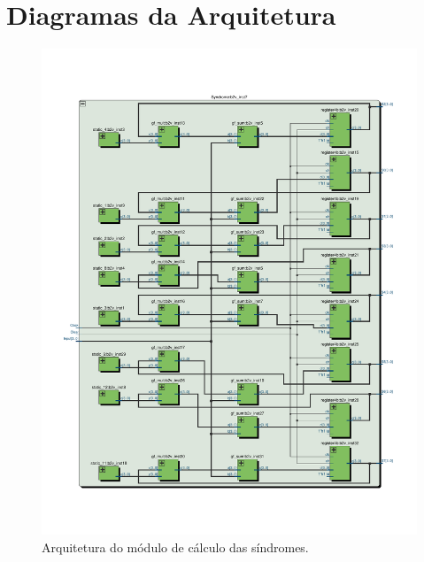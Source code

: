 \chapter{Diagramas da Arquitetura}

\begin{figure}[!htb]
	\caption{\label{fig_sindrome_arq}Arquitetura do módulo de cálculo das síndromes.}
	\centering%
	\includegraphics[width=1\textwidth, trim={2cm 5cm 2cm 5cm}]{RS/SindromeRTL.pdf}
	\legend{}
\end{figure}

